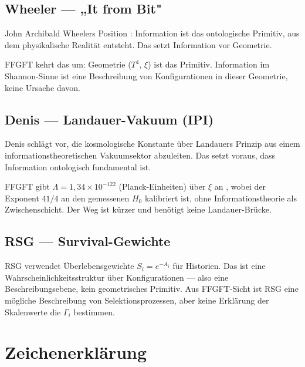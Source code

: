 \subsection{Wheeler — „It from Bit"}

John Archibald Wheelers Position \cite{Wheeler1990}: Information ist das
ontologische Primitiv, aus dem physikalische Realität entsteht. Das setzt
Information vor Geometrie.

FFGFT kehrt das um: Geometrie ($T^4$, $\xi$) ist das Primitiv. Information
im Shannon-Sinne ist eine Beschreibung von Konfigurationen in dieser Geometrie,
keine Ursache davon.

\subsection{Denis — Landauer-Vakuum (IPI)}

Denis \cite{Denis2023} schlägt vor, die kosmologische Konstante über
Landauers Prinzip aus einem informationstheoretischen Vakuumsektor
abzuleiten. Das setzt voraus, dass Information ontologisch fundamental ist.

FFGFT gibt $\Lambda = 1{,}34 \times 10^{-122}$ (Planck-Einheiten)
über $\xi$ an \cite{Pascher_182}, wobei der Exponent $41/4$ an den
gemessenen $H_0$ kalibriert ist, ohne Informationstheorie als
Zwischenschicht. Der Weg ist kürzer und benötigt keine Landauer-Brücke.

\subsection{RSG — Survival-Gewichte}

RSG \cite{Austin2026} verwendet Überlebensgewichte $S_i = e^{-A_i}$ für
Historien. Das ist eine Wahrscheinlichkeitsstruktur über Konfigurationen —
also eine Beschreibungsebene, kein geometrisches Primitiv. Aus FFGFT-Sicht
ist RSG eine mögliche Beschreibung von Selektionsprozessen, aber keine
Erklärung der Skalenwerte die $\Gamma_i$ bestimmen.

\section{Zeichenerklärung}

